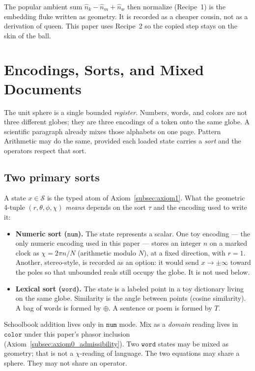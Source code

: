 \documentclass[12pt, a4paper]{article}
\begin{document}
The popular ambient sum $\hat n_k-\hat n_m+\hat n_w$ then
normalize (Recipe~1) is the embedding fluke written as geometry.
It is recorded as a cheaper cousin, not as a derivation of
$\mathrm{queen}$. This paper uses Recipe~2 so the copied step
stays on the skin of the ball.

\section{Encodings, Sorts, and Mixed Documents}
\label{sec:encodings_sorts}

The unit sphere is a single bounded \emph{register}.
Numbers, words, and colors are not three different globes; they are
three encodings of a token onto the same globe. A scientific paragraph
already mixes those alphabets on one page. Pattern Arithmetic may do
the same, provided each loaded state carries a \emph{sort} and the
operators respect that sort.

\subsection{Two primary sorts}
\label{subsec:sorts}
A state $x\in\mathcal{S}$ is the typed atom of
Axiom~\ref{subsec:axiom1}. What the geometric 4-tuple
$(r,\theta,\phi,\chi)$ \emph{means} depends on the sort $\tau$ and the
encoding used to write it:
\begin{itemize}
    \item \textbf{Numeric sort ($\mathtt{num}$).}
          The state represents a scalar. One toy encoding --- the only
          numeric encoding used in this paper --- stores an
          integer $n$ on a marked clock as
          $\chi = 2\pi n/N$ (arithmetic modulo $N$), at a fixed
          direction, with $r=1$.
          Another, stereo-style, is recorded as an option: it would
          send $x\to\pm\infty$ toward the
          poles so that unbounded reals still occupy the globe. It is
          not used below.
    \item \textbf{Lexical sort ($\mathtt{word}$).}
          The state is a labeled point in a toy dictionary living on
          the same globe. Similarity is the angle between points
          (cosine similarity). A bag of words is formed by $\oplus$.
          A sentence or poem is formed by $T$.
\end{itemize}
Schoolbook addition lives only in $\mathtt{num}$ mode.
Mix as a \emph{domain} reading lives in $\mathtt{color}$ under this
paper's phasor inclusion (Axiom~\ref{subsec:axiom0_admissibility}).
Two $\mathtt{word}$ states may be mixed as geometry; that is not a
$\chi$-reading of language. The two equations may share a sphere.
They may not share an operator.
\end{document}
